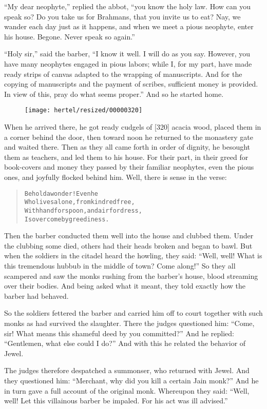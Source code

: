 \documentclass[article, twoside, 10pt]{memoir}
\renewenvironment{verbatim}{%
\begin{quote}%
\vskip -10pt%
\begin{alltt}\normalfont\small}{\end{alltt}%
\end{quote}%
\vskip -10pt
} %
\begin{document}
``My dear neophyte,'' replied the abbot,
``you know the holy law. How can you speak so? Do you take us for Brahmans, that you invite us to eat? Nay, we wander each day just as it happens, and when we meet a pious neophyte, enter his house. Begone. Never speak so again.''

``Holy sir,'' said the barber,
``I know it well. I will do as you say. However, you have many neophytes engaged in pious labors; while I, for my part, have made ready strips of canvas adapted to the wrapping of manuscripts. And for the copying of manuscripts and the payment of scribes, sufficient money is provided. In view of this, pray do what seems proper.''
And so he started home.

\begin{figure}[p]\texttt{[image: hertel/resized/00000320]}\end{figure}When he arrived there, he got ready cudgels of [320] acacia wood,
placed them in a corner behind the door, then toward noon he
returned to the monastery gate and waited there. Then as they all
came forth in order of dignity, he besought them as teachers, and
led them to his house. For their part, in their greed for
book-covers and money they passed by their familiar neophytes, even
the pious ones, and joyfully flocked behind him. Well, there is
sense in the verse:

\begin{verbatim}
Behold a wonder! Even he
Who lives alone, from kindred free,
With hand for spoon, and air for dress,
Is overcome by greediness.
\end{verbatim}
Then the barber conducted them well into the house and clubbed
them. Under the clubbing some died, others had their heads broken
and began to bawl. But when the soldiers in the citadel heard the
howling, they said:
``Well, well! What is this tremendous hubbub in the middle of town? Come along!''
So they all scampered and saw the monks rushing from the barber's
house, blood streaming over their bodies. And being asked what it
meant, they told exactly how the barber had behaved.

So the soldiers fettered the barber and carried him off to court
together with such monks as had survived the slaughter. There the
judges questioned him:
``Come, sir! What means this shameful deed by you committed?'' And
he replied: ``Gentlemen, what else could I do?'' And with this he
related the behavior of Jewel.

The judges therefore despatched a summonser, who returned with
Jewel. And they questioned him:
``Merchant, why did you kill a certain Jain monk?'' And he in turn
gave a full account of the original monk. Whereupon they said:
``Well, well! Let this villainous barber be impaled. For his act was ill advised.''
\end{document}

